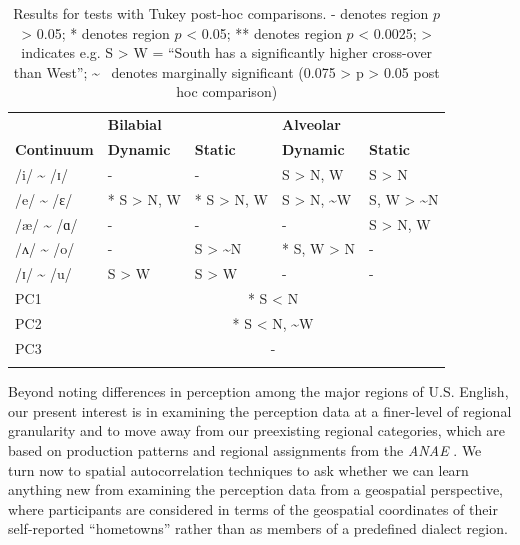 \documentclass[output=paper]{LSP/langsci}
\begin{document}
\begin{table}
\begin{tabular}{lllll}
\lsptoprule 
& {\bfseries Bilabial} &  & {\bfseries Alveolar} & \\
\cmidrule(lr){2-3}\cmidrule(lr){4-5}
{\bfseries Continuum} & {\bfseries Dynamic} & {\bfseries Static} & {\bfseries Dynamic} & {\bfseries Static}\\
\midrule
{\mdseries /i/ {\textasciitilde} /ɪ/} & {\mdseries {}-} & {\mdseries {}-} & {\mdseries * S {\textgreater} N, W} & {\mdseries * S {\textgreater} N}\\
{\mdseries /e/ {\textasciitilde} /ɛ/ } & {\mdseries ** S {\textgreater} N, W} & {\mdseries ** S {\textgreater} N, W} & {\mdseries * S {\textgreater} N, {\textasciitilde}W} & {\mdseries * S, W {\textgreater} {\textasciitilde}N}\\
{\mdseries /æ/ {\textasciitilde} /ɑ/ } & {\mdseries {}-} & {\mdseries {}-} & {\mdseries {}-} & {\mdseries * S {\textgreater} N, W}\\
{\mdseries  /ʌ/ {\textasciitilde} /o/} & {\mdseries {}-} & {\mdseries * S {\textgreater} {\textasciitilde}N} & {\mdseries ** S, W {\textgreater} N} & {\mdseries {}-}\\
{\mdseries /ɪ/ {\textasciitilde} /u/} & {\mdseries * S {\textgreater} W} & {\mdseries * S {\textgreater} W} & {\mdseries {}-} & {\mdseries {}-}\\
\midrule
{\mdseries PC1} & \multicolumn{4}{c}{ * S {\textless} N\par}\\
{\mdseries PC2} & \multicolumn{4}{c}{ * S {\textless} N, {\textasciitilde}W\par}\\
{\mdseries PC3} & \multicolumn{4}{c}{ {}-\par}\\
\lspbottomrule
\end{tabular}
\caption{Results for  tests with Tukey post-hoc comparisons. - denotes region $p$ {\textgreater} 0.05; * denotes region $p$ {\textless} 0.05; ** denotes region $p$ {\textless} 0.0025; {\textgreater} indicates e.g. S {\textgreater} W = “South has a significantly higher cross-over than West”; {\textasciitilde} ~denotes marginally significant (0.075 {\textgreater} p {\textgreater} 0.05 post hoc comparison)}
\label{tab:1}
\end{table}

Beyond noting differences in perception among the major regions of U.S. English, our present interest is in examining the perception data at a finer-level of regional granularity and to move away from our preexisting regional categories, which are based on production patterns and regional assignments from the \textit{ANAE} \citep{labov_atlas_2006-1}. We turn now to spatial autocorrelation techniques to ask whether we can learn anything new from examining the perception data from a geospatial perspective, where participants are considered in terms of the geospatial coordinates of their self-reported “hometowns” rather than as members of a predefined dialect region. 
\end{document}
